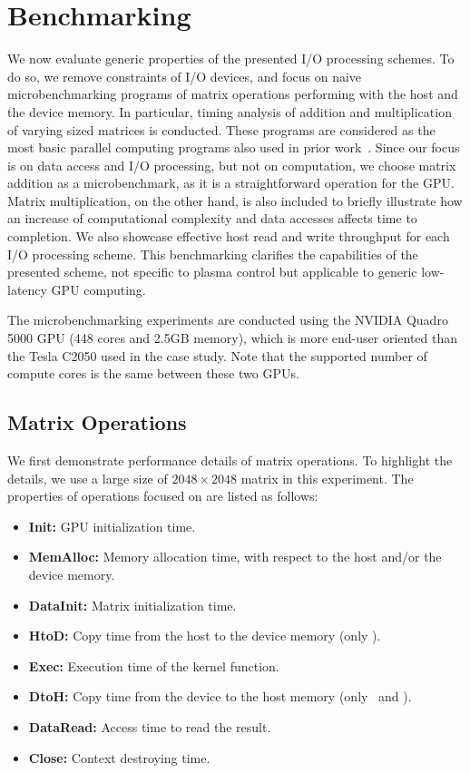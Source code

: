 \section{Benchmarking}
\label{sec:benchmarking}

We now evaluate generic properties of the presented I/O processing
schemes.
To do so, we remove constraints of I/O devices, and focus on naive
microbenchmarking programs of matrix operations performing with the host
and the device memory.
In particular, timing analysis of addition and multiplication of varying
sized matrices is conducted.
These programs are considered as the most basic parallel computing
programs also used in prior work~\cite{Rossbach_SOSP11}.
Since our focus is on data access and I/O processing, but not on
computation, we choose matrix addition as a microbenchmark, as it is 
a straightforward operation for the GPU.
Matrix multiplication, on the other hand, is also included to briefly
illustrate how an increase of computational complexity and data accesses
affects time to completion.
We also showcase effective host read and write throughput for each I/O
processing scheme.
This benchmarking clarifies the capabilities of the presented scheme, not
specific to plasma control but applicable to generic low-latency
GPU computing.

The microbenchmarking experiments are conducted using the NVIDIA Quadro
5000 GPU (448 cores and 2.5GB memory), which is more end-user oriented
than the Tesla C2050 used in the case study.
Note that the supported number of compute cores is the same between
these two GPUs.

\subsection{Matrix Operations}
\label{sec:matrix}

We first demonstrate performance details of matrix operations.
To highlight the details, we use a large size of $2048\times2048$ matrix
in this experiment.
The properties of operations focused on are listed as follows:

\begin{itemize} \itemsep1pt
 \item {\bf Init:} GPU initialization time.
 \item {\bf MemAlloc:} Memory allocation time, with respect to the host
       and/or the device memory.
 \item {\bf DataInit:} Matrix initialization time.
 \item {\bf HtoD:} Copy time from the host to the device memory (only \hd).
 \item {\bf Exec:} Execution time of the kernel function.
 \item {\bf DtoH:} Copy time from the device to the host memory (only
       \hd\ and \dmh).
 \item {\bf DataRead:} Access time to read the result.
 \item {\bf Close:} Context destroying time.
\end{itemize}

